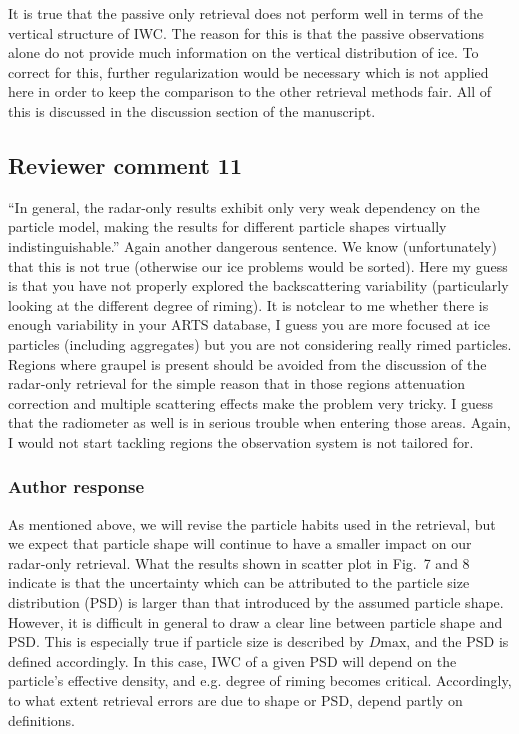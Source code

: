 \documentclass[11pt]{scrartcl}
\begin{document}
It is true that the passive only retrieval does not perform well in terms of the
vertical structure of IWC. The reason for this is that the passive observations
alone do not provide much information on the vertical distribution of ice. To
correct for this, further regularization would be necessary which is not applied
here in order to keep the comparison to the other retrieval methods fair. All of
this is discussed in the discussion section of the manuscript.

\subsection*{Reviewer comment 11}

“In general, the radar-only results exhibit only very weak dependency on the
particle model, making the results for different particle shapes virtually
indistinguishable.” Again another dangerous sentence. We know (unfortunately)
that this is not true (otherwise our ice problems would be sorted). Here my guess
is that you have not properly explored the backscattering variability
(particularly looking at the different degree of riming). It is notclear to me
whether there is enough variability in your ARTS database, I guess you are more
focused at ice particles (including aggregates) but you are not considering
really rimed particles. Regions where graupel is present should be avoided from
the discussion of the radar-only retrieval for the simple reason that in those
regions attenuation correction and multiple scattering effects make the problem
very tricky. I guess that the radiometer as well is in serious trouble when
entering those areas. Again, I would not start tackling regions the observation
system is not tailored for.

\subsubsection*{Author response}

As mentioned above, we will revise the particle habits used in the retrieval,
but we expect that particle shape will continue to have a smaller impact on our
radar-only retrieval. What the results shown in scatter plot in Fig.~7 and 8
indicate is that the uncertainty which can be attributed to the particle size
distribution (PSD) is larger than that introduced by the assumed particle shape.
However, it is difficult in general to draw a clear line between particle shape
and PSD. This is especially true if particle size is described by $D\text{max}$,
and the PSD is defined accordingly. In this case, IWC of a given PSD will depend
on the particle's effective density, and e.g. degree of riming becomes critical.
Accordingly, to what extent retrieval errors are due to shape or PSD, depend
partly on definitions.
\end{document}
